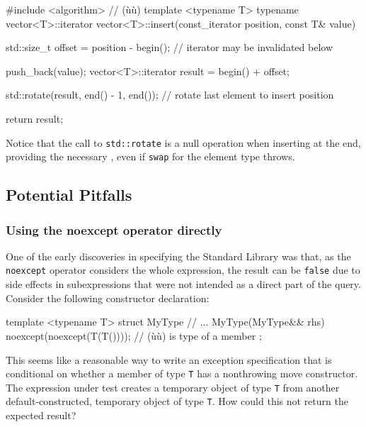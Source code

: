 \begin{emcppslisting}[emcppsbatch=e25]
#include <algorithm>  // (ù{}ù)
template <typename T>
typename vector<T>::iterator vector<T>::insert(const_iterator position, const T& value)
{
    std::size_t offset = position - begin();
        // iterator may be invalidated below

    push_back(value);
    vector<T>::iterator result = begin() + offset;

    std::rotate(result, end() - 1, end());
        // rotate last element to insert position

    return result;
}
\end{emcppslisting}
    

\noindent Notice that the call to \lstinline!std::rotate! is a null operation when
inserting at the end, providing the necessary , even if \lstinline!swap! for the element type
throws.

\subsection[Potential Pitfalls]{Potential Pitfalls}\label{potential-pitfalls-noexceptoperator}

\subsubsection[Using the \lstinline!noexcept! operator directly]{Using the {\SubsubsecCode noexcept} operator directly}\label{using-the-noexcept-operator-directly}

One of the early discoveries in specifying the Standard Library was
that, as the \lstinline!noexcept! operator considers the whole expression,
the result can be \lstinline!false! due to side effects in subexpressions
that were not intended as a direct part of the query. Consider the
following constructor declaration:

\begin{emcppslisting}
template <typename T>
struct MyType
{
    // ...
    MyType(MyType&& rhs) noexcept(noexcept(T(T())));  // (ù{}ù) is type of a member
};
\end{emcppslisting}
    

\noindent This seems like a reasonable way to write an exception specification
that is conditional on whether a member of type \lstinline!T! has a
nonthrowing move constructor. The expression under test creates a
temporary object of type \lstinline!T! from another default-constructed,
temporary object of type \lstinline!T!. How could this not return the
expected result?

